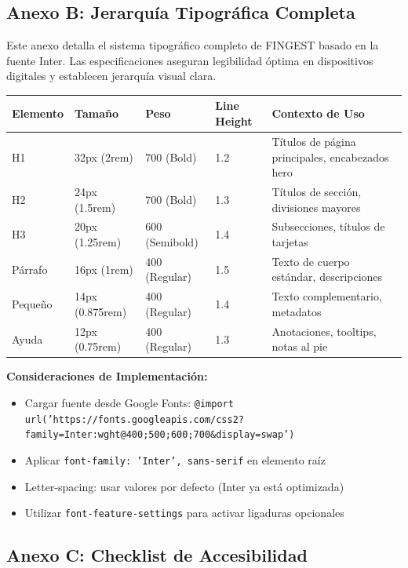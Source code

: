 \documentclass[12pt,a4paper,oneside]{article}
\begin{document}
\subsection{Anexo B: Jerarquía Tipográfica Completa}

Este anexo detalla el sistema tipográfico completo de FINGEST basado en la fuente Inter. Las especificaciones aseguran legibilidad óptima en dispositivos digitales y establecen jerarquía visual clara.

\begin{center}
\begin{tabular}{|l|l|l|l|p{5cm}|}
\hline
\textbf{Elemento} & \textbf{Tamaño} & \textbf{Peso} & \textbf{Line Height} & \textbf{Contexto de Uso} \\
\hline
H1 & 32px (2rem) & 700 (Bold) & 1.2 & Títulos de página principales, encabezados hero \\
\hline
H2 & 24px (1.5rem) & 700 (Bold) & 1.3 & Títulos de sección, divisiones mayores \\
\hline
H3 & 20px (1.25rem) & 600 (Semibold) & 1.4 & Subsecciones, títulos de tarjetas \\
\hline
Párrafo & 16px (1rem) & 400 (Regular) & 1.5 & Texto de cuerpo estándar, descripciones \\
\hline
Pequeño & 14px (0.875rem) & 400 (Regular) & 1.4 & Texto complementario, metadatos \\
\hline
Ayuda & 12px (0.75rem) & 400 (Regular) & 1.3 & Anotaciones, tooltips, notas al pie \\
\hline
\end{tabular}
\end{center}

\vspace{0.5cm}

\textbf{Consideraciones de Implementación:}
\begin{itemize}
    \item Cargar fuente desde Google Fonts: \texttt{@import url('https://fonts.googleapis.com/css2?family=Inter:wght@400;500;600;700\&display=swap')}
    \item Aplicar \texttt{font-family: 'Inter', sans-serif} en elemento raíz
    \item Letter-spacing: usar valores por defecto (Inter ya está optimizada)
    \item Utilizar \texttt{font-feature-settings} para activar ligaduras opcionales
\end{itemize}

\subsection{Anexo C: Checklist de Accesibilidad}
\end{document}
